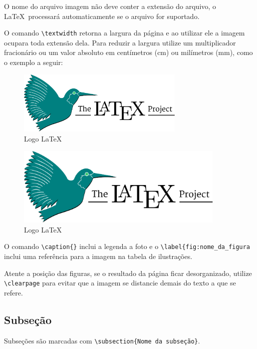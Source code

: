 O nome do arquivo imagem não deve conter a extensão do arquivo, o \LaTeX \ processará automaticamente se o arquivo for suportado. 

O comando \verb+\textwidth+ retorna a largura da página e ao utilizar ele a imagem ocupara toda extensão dela. Para reduzir a largura utilize um multiplicador fracionário ou um valor absoluto em centímetros (cm) ou milímetros (mm), como o exemplo a seguir:

\begin{figure}[!htb]
	\centering 
	\includegraphics[width=8cm]{imagens/latex}
	\caption{Logo \LaTeX}
	\label{fig:Latex}
\end{figure}

\begin{figure}[!htb]
	\centering 
	\includegraphics[width=100mm]{imagens/latex}
	\caption{Logo \LaTeX}
	\label{fig:Latex2}
\end{figure}

O comando \verb+\caption{}+ inclui a legenda a foto e o \verb|\label{fig:nome_da_figura| inclui uma  referência para a imagem na tabela de ilustrações. 

Atente a posição das figuras, se o resultado da página ficar desorganizado, utilize \verb|\clearpage| para evitar que a imagem se distancie demais do texto a que se refere. 

\subsection{Subseção}
Subseções são marcadas com \verb|\subsection{Nome da subseção}|. 

